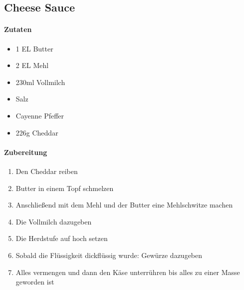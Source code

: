 \newpage
\subsection{Cheese Sauce}
\paragraph{Zutaten}
\begin{itemize}[noitemsep]
	\item 1 EL Butter 
	\item 2 EL Mehl
	\item 230ml Vollmilch
	\item Salz
	\item Cayenne Pfeffer
	\item 226g Cheddar
\end{itemize}

\paragraph{Zubereitung}
\begin{enumerate}[noitemsep]
	\item Den Cheddar reiben
	\item Butter in einem Topf schmelzen
	\item Anschließend mit dem Mehl und der Butter eine Mehlschwitze machen
	\item Die Vollmilch dazugeben
	\item Die Herdstufe auf hoch setzen
	\item Sobald die Flüssigkeit dickflüssig wurde: Gewürze dazugeben
	\item Alles vermengen und dann den Käse unterrühren bis alles zu einer Masse geworden ist
\end{enumerate}
